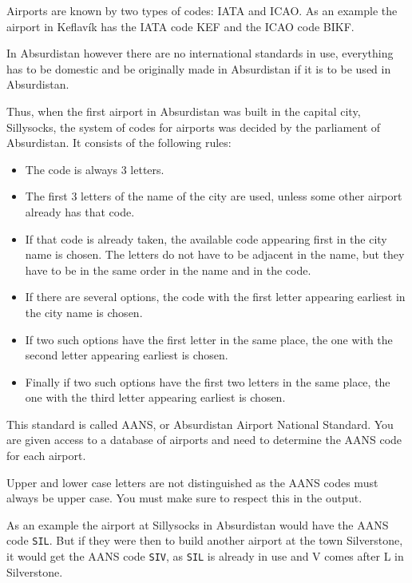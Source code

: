 
Airports are known by two types of codes: IATA and ICAO.
As an example the airport in Keflavík has the IATA code KEF and the ICAO code BIKF.

In Absurdistan however there are no international standards in use, 
everything has to be domestic and be originally made in Absurdistan if it is to be used in Absurdistan.

Thus, when the first airport in Absurdistan was built in the capital city, Sillysocks, 
the system of codes for airports was decided by the parliament of Absurdistan.
It consists of the following rules:

\begin{itemize}
    \item The code is always 3 letters.
    \item The first 3 letters of the name of the city are used, unless some other airport already has that code.
    \item If that code is already taken, the available code appearing first in the city name is chosen. 
        The letters do not have to be adjacent in the name, but they have to be in the same order in the name and in the code.
    \item If there are several options, the code with the first letter appearing earliest in the city name is chosen.
    \item If two such options have the first letter in the same place, the one with the second letter appearing earliest is chosen.
    \item Finally if two such options have the first two letters in the same place, the one with the third letter appearing earliest is chosen.
\end{itemize}

This standard is called AANS, or Absurdistan Airport National Standard.
You are given access to a database of airports and need to determine the AANS code for each airport.

Upper and lower case letters are not distinguished as the AANS codes must always be upper case.
You must make sure to respect this in the output.

As an example the airport at Sillysocks in Absurdistan would have the AANS code \texttt{SIL}. 
But if they were then to build another airport at the town Silverstone, it would get the AANS code \texttt{SIV},
as \texttt{SIL} is already in use and V comes after L in Silverstone.

